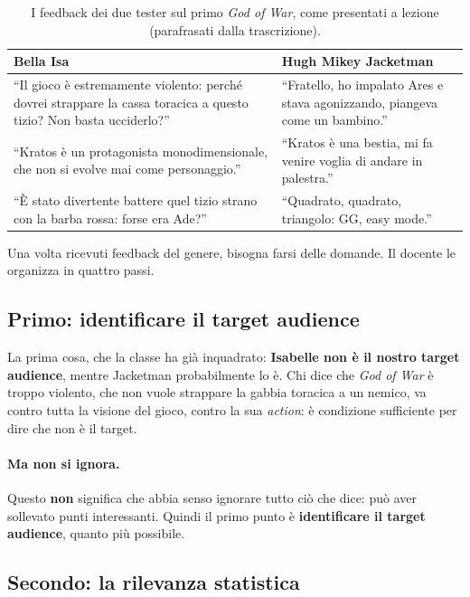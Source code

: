 \begin{table}[htbp]
  \centering
  \caption{I feedback dei due tester sul primo \emph{God of War}, come
  presentati a lezione (parafrasati dalla trascrizione).}
  \label{gd10:tab:gow-feedback}
  \small
  \begin{tabular}{@{}p{}p{}@{}}
    \toprule
    \textbf{Bella Isa} & \textbf{Hugh Mikey Jacketman} \\
    \midrule
    ``Il gioco è estremamente violento: perché dovrei strappare la cassa
      toracica a questo tizio? Non basta ucciderlo?'' &
      ``Fratello, ho impalato Ares e stava agonizzando, piangeva come un
      bambino.'' \\
    \addlinespace
    ``Kratos è un protagonista monodimensionale, che non si evolve mai
      come personaggio.'' &
      ``Kratos è una bestia, mi fa venire voglia di andare in palestra.'' \\
    \addlinespace
    ``È stato divertente battere quel tizio strano con la barba rossa:
      forse era Ade?'' &
      ``Quadrato, quadrato, triangolo: GG, easy mode.'' \\
    \bottomrule
  \end{tabular}
\end{table}

Una volta ricevuti feedback del genere, bisogna farsi delle domande. Il
docente le organizza in quattro passi.

\subsection{Primo: identificare il target audience}

La prima cosa, che la classe ha già inquadrato: \textbf{Isabelle non è il
nostro target audience}, mentre Jacketman probabilmente lo è. Chi dice che
\emph{God of War} è troppo violento, che non vuole strappare la gabbia
toracica a un nemico, va contro tutta la visione del gioco, contro la sua
\emph{action}: è condizione sufficiente per dire che non è il target.

\paragraph{Ma non si ignora.} Questo \textbf{non} significa che abbia senso
ignorare tutto ciò che dice: può aver sollevato punti interessanti. Quindi il
primo punto è \textbf{identificare il target audience}, quanto più possibile.

\subsection{Secondo: la rilevanza statistica}

